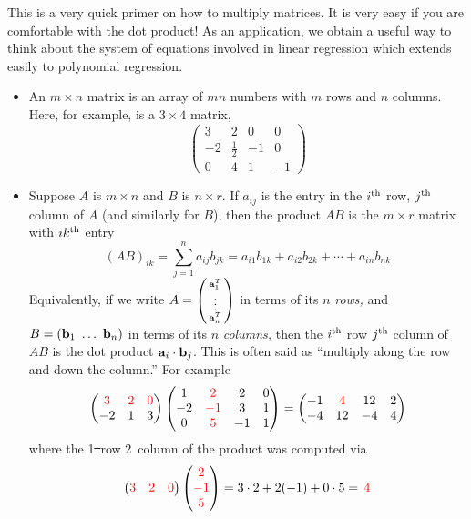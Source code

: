 \iffalse
This is a very quick primer on how to multiply matrices. It is very easy if you are comfortable with the dot product! As an application, we obtain a useful way to think about the system of equations involved in linear regression which extends easily to polynomial regression. 
\begin{itemize}
  \item An $m\times n$ matrix is an array of $mn$ numbers with $m$ rows and $n$ columns. Here, for example, is a $3\times 4$ matrix,
  \[\begin{pmatrix}
  3&2&0&0\\
  -2&\frac 12&-1&0\\
  0&4&1&-1
  \end{pmatrix}\]
  \item Suppose $A$ is $m\times n$ and $B$ is $n\times r$. If $a_{ij}$ is the entry in the $i\textsuperscript{th}$ row, $j\textsuperscript{th}$ column of $A$ (and similarly for $B$), then the product $AB$ is the $m\times r$ matrix with $ik\textsuperscript{th}$ entry
  \[(AB)_{ik}=\sum_{j=1}^na_{ij}b_{jk} =a_{i1}b_{1k}+a_{i2}b_{2k}+\cdots +a_{in}b_{nk}\]
  Equivalently, if we write $A=\left(\begin{smallmatrix}{\mathbf{a}}_1^T\\\vdots\\{\mathbf{a}}_n^T\end{smallmatrix}\right)$ in terms of its $n$ \emph{rows,} and $B=(\vb_1\ \ldots\ \vb_n)$ in terms of its $n$ \emph{columns,} then the $i\textsuperscript{th}$ row $j\textsuperscript{th}$ column of $AB$ is the dot product ${\mathbf{a}}_i\cdot {\mathbf{b}}_j$. This is often said as ``multiply along the row and down the column.'' For example
  \[\begin{pmatrix}
  \textcolor{red}{3}&\textcolor{red}{2}&\textcolor{red}{0}\\
  -2&1&3
  \end{pmatrix}\begin{pmatrix}
  1&\textcolor{red}{2}&2&0\\
  -2&\textcolor{red}{-1}&3&1\\
  0&\textcolor{red}{5}&-1&1
  \end{pmatrix}
  =\begin{pmatrix}
  -1&\textcolor{red}{4}&12&2\\
  -4&12&-4&4
  \end{pmatrix}\]
  where the 1\st\ row 2\nd\ column of the product was computed via
  \[\begin{pmatrix}
  \textcolor{red}{3}&\textcolor{red}{2}&\textcolor{red}{0}
  \end{pmatrix}\begin{pmatrix}
  \textcolor{red}{2}\\
  \textcolor{red}{-1}\\
  \textcolor{red}{5}
  \end{pmatrix} =3\cdot 2+2(-1)+0\cdot 5 =\,\textcolor{red}{4}\]

\end{itemize}
